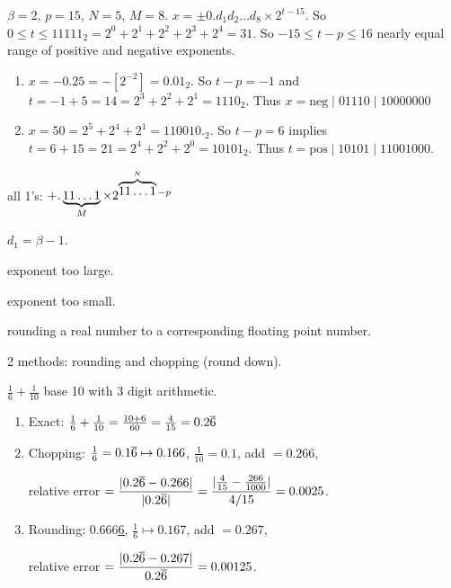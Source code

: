 \documentclass[]{article}
\begin{document}
\begin{example}
	$\beta = 2$, $p = 15$, $N=5$, $M=8$. $x = \pm 0.d_1d_2\dots d_8\times 2^{t-15}$.
	So $0\leq t\leq 11111_2 = 2^0+2^1+2^2+2^3+2^4 = 31$. So $-15\leq t-p\leq 16$ nearly equal range of positive and negative exponents.
	\begin{enumerate}
		\item $x = -0.25 = -[2^{-2}] = 0.01_2$. So $t-p = -1$ and $t=-1+5 = 14 = 2^3+2^2 + 2^1 = 1110_2$. Thus $x = \text{neg}\mid 01110\mid 10000000$
		\item $x = 50 = 2^5+2^4+2^1 = 110010._2$. So $t-p=6$ implies $t=6+15=21 = 2^4 + 2^2 + 2^0 = 10101_2$. Thus $t = \text{pos}\mid 10101\mid 11001000$.
	\end{enumerate}
\end{example}

\begin{note}
	 all 1's: $+.\ub{M}{11\dots1}\times 2^{\ob{N}{11\dots1}-p}$
\end{note}
\begin{note}
	[Normailzed] $d_1 = \beta-1$.
\end{note}
\begin{note}
	[Overflow] exponent too large.
\end{note}
\begin{note}
	[Underflow] exponent too small.
\end{note}
\begin{definition}
	 rounding a real number to a corresponding floating point number.
\end{definition}
2 methods: rounding and chopping (round down).
\begin{example}
	$\frac16+\frac1{10}$ base 10 with 3 digit arithmetic.
	\begin{enumerate}
		\item Exact: $\frac16+\frac1{10} = \frac{10+6}{60} = \frac4{15} = 0.2\conj6$
		\item Chopping: $\frac16 = 0.1\conj6\mapsto 0.166$, $\frac1{10} = 0.1$, add $= 0.266$, 
			
			relative error $\ds= \frac{|0.2\conj6-0.266|}{|0.2\conj6|} = \frac{|\frac4{15} - \frac{266}{1000}|}{4/15} = 0.0025$.
		\item Rounding: 0.666\ul{\ul{6}}, $\frac16\mapsto 0.167$, add $= 0.267$, 
			
			relative error $\ds= \frac{|0.2\conj6-0.267|}{0.2\conj6} = 0.00125$.
	\end{enumerate}
\end{example}
\end{document}

